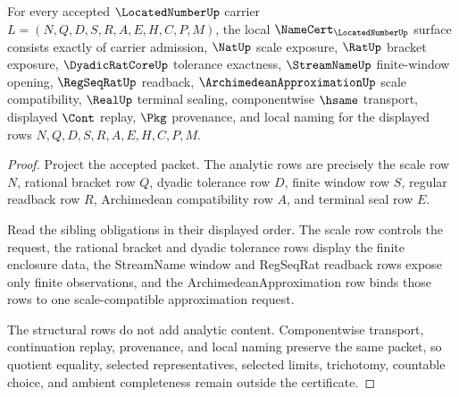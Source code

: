 \begin{theorem}
\label{thm:located-number-namecert-obligations}
For every accepted $\LocatedNumberUp$ carrier $L=(N,Q,D,S,R,A,E,H,C,P,M)$, the local $\NameCert_{\LocatedNumberUp}$ surface consists exactly of carrier admission, $\NatUp$ scale exposure, $\RatUp$ bracket exposure, $\DyadicRatCoreUp$ tolerance exactness, $\StreamNameUp$ finite-window opening, $\RegSeqRatUp$ readback, $\ArchimedeanApproximationUp$ scale compatibility, $\RealUp$ terminal sealing, componentwise $\hsame$ transport, displayed $\Cont$ replay, $\Pkg$ provenance, and local naming for the displayed rows $N,Q,D,S,R,A,E,H,C,P,M$.
\end{theorem}
\begin{proof}
Project the accepted packet. The analytic rows are precisely the scale row $N$, rational bracket row $Q$, dyadic tolerance row $D$, finite window row $S$, regular readback row $R$, Archimedean compatibility row $A$, and terminal seal row $E$.

Read the sibling obligations in their displayed order. The scale row controls the request, the rational bracket and dyadic tolerance rows display the finite enclosure data, the StreamName window and RegSeqRat readback rows expose only finite observations, and the ArchimedeanApproximation row binds those rows to one scale-compatible approximation request.

The structural rows do not add analytic content. Componentwise transport, continuation replay, provenance, and local naming preserve the same packet, so quotient equality, selected representatives, selected limits, trichotomy, countable choice, and ambient completeness remain outside the certificate.
\end{proof}

